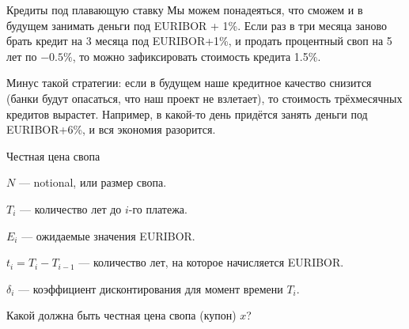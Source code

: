 \documentclass{beamer}
\begin{document}
\begin{frame}{Кредиты под плавающую ставку}
\justify
Мы можем понадеяться, что сможем и в будущем занимать деньги под EURIBOR + 1\%. Если раз в три месяца заново брать кредит на 3 месяца под EURIBOR+1\%, и продать процентный своп на 5 лет по $-0.5\%$, то можно зафиксировать стоимость кредита 1.5\%.

\justify
Минус такой стратегии: если в будущем наше кредитное качество снизится (банки будут опасаться, что наш проект не взлетает), то стоимость трёхмесячных кредитов вырастет. Например, в какой-то день придётся занять деньги под EURIBOR+6\%, и вся экономия разорится.
\end{frame}



\begin{frame}{Честная цена свопа}
\centering
{}

\justify
$N$ --- notional, или размер свопа.

$T_i$ --- количество лет до $i$-го платежа.

$E_i$ --- ожидаемые значения EURIBOR.

$t_i = T_i - T_{i-1}$ --- количество лет, на которое начисляется EURIBOR.

$\delta_i$ --- коэффициент дисконтирования для момент времени $T_i$.

\justify
Какой должна быть честная цена свопа (купон) $x$?
\end{frame}
\end{document}
